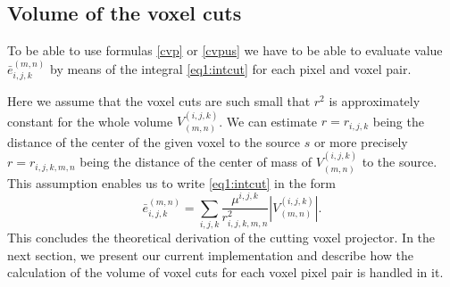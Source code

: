 \subsection{Volume of the voxel cuts}
To be able to use formulas \eqref{cvp} or \eqref{cvpus} we have to be able to evaluate value  $\bar{e}_{i,j,k}^{(m,n)}$ by means of the integral \eqref{eq1:intcut} for each pixel and voxel pair.

Here we assume that the voxel cuts are such small that $r^2$ is approximately constant for the whole volume $V^{(i,j,k)}_{(m,n)}$. We can estimate $r=r_{i,j,k}$ being the distance of the center of the given voxel to the source $s$ or more precisely $r=r_{i,j,k,m,n}$ being the distance of the center of mass of  $V^{(i,j,k)}_{(m,n)}$ to the source. This assumption enables us to write \eqref{eq1:intcut} in the form
\begin{equation}
    \bar{e}_{i,j,k}^{(m,n)} = \sum_{i,j,k} \frac{\mu^{i,j,k}}{r_{i,j,k,m,n}^2} |V^{(i,j,k)}_{(m,n)}|. \label{vox}
\end{equation}
This concludes the theoretical derivation of the cutting voxel projector. In the next section, we present our current implementation and describe how the calculation of the volume of voxel cuts for each voxel pixel pair is handled in it. 

